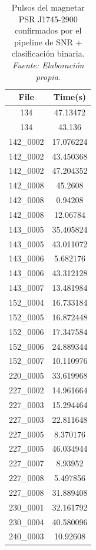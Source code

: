 \begin{table}[H]
    \centering
    \caption{Pulsos del magnetar PSR J1745-2900 confirmados por el pipeline de SNR + clasificación binaria. \textit{Fuente: Elaboración propia}.}
    \label{tab:alma_confirmed_pulses}
    \begin{tabular}{|c|c|}
        \hline
        \textbf{File} & \textbf{Time(s)} \\
        \hline
        134 & 47.13472 \\
        134 & 43.136 \\
        142\_0002 & 17.076224 \\
        142\_0002 & 43.450368 \\
        142\_0002 & 47.204352 \\
        142\_0008 & 45.2608 \\
        142\_0008 & 0.94208 \\
        142\_0008 & 12.06784 \\
        143\_0005 & 35.405824 \\
        143\_0005 & 43.011072 \\
        143\_0006 & 5.682176 \\
        143\_0006 & 43.312128 \\
        143\_0007 & 13.481984 \\
        152\_0004 & 16.733184 \\
        152\_0005 & 16.872448 \\
        152\_0006 & 17.347584 \\
        152\_0006 & 24.889344 \\
        152\_0007 & 10.110976 \\
        220\_0005 & 33.619968 \\
        227\_0002 & 14.961664 \\
        227\_0003 & 15.294464 \\
        227\_0003 & 22.811648 \\
        227\_0005 & 8.370176 \\
        227\_0005 & 46.034944 \\
        227\_0007 & 8.93952 \\
        227\_0008 & 5.497856 \\
        227\_0008 & 31.889408 \\
        230\_0001 & 32.161792 \\
        230\_0004 & 40.580096 \\
        240\_0003 & 10.92608 \\

\end{tabular}
\end{table}

